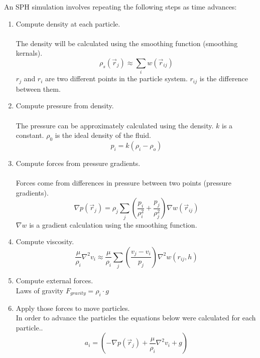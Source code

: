 \documentclass[a4paper,12pt,twoside,final]{report}
\begin{document}
\noindent An SPH simulation involves repeating the following steps as time advances:
\begin{enumerate}

\item Compute density at each particle. \\ \\
\noindent The density will be calculated using the smoothing function (smoothing kernals).
\begin{equation}
{\rho_s}{(\overrightarrow r_j)} {\approx} {\sum_i}{w(\overrightarrow r_{ij})}
\label{e3}
\end{equation}
\noindent $r_j$ and $r_i$ are two different points in the particle system. $r_{ij}$ is the difference between them. \\

\item Compute pressure from density. \\ \\
\noindent The pressure can be approximately calculated using the density. $k$ is a constant. $\rho_0$ is the ideal density of the fluid.
\begin{equation}
{p_i} = {k(\rho_i -\rho_o)}
\label{e4}
\end{equation}

\item Compute forces from pressure gradients. \\ \\
\noindent Forces come from differences in pressure between two points (pressure gradients).
\begin{equation}
{\nabla p(\overrightarrow r_j)} =  {\rho_j}{\sum_j}(\frac{p_i}{\rho_i^2}+\frac{p_j}{\rho_j^2}){\nabla w(\overrightarrow r_{ij})}
\label{e5}
\end{equation}
\noindent $\nabla w$ is a gradient calculation using the smoothing function. \\

\item Compute viscosity.
\begin{equation}
\frac{\mu}{\rho_i}{ \nabla^2 v_i} \approx \frac{\mu}{\rho_i}{\sum_j}(\frac{v_j - v_i}{p_j}){\nabla^2 w(r_{ij},h)}
\label{e6}
\end{equation}

\item Compute external forces. \\
\noindent Laws of gravity $F_{gravity}=\rho_i \cdot g$

\item Apply those forces to move particles. \\
\noindent In order to advance the particles the equations below were calculated for each particle..
\begin{equation}
{a_i} = {(-\nabla p(\overrightarrow r_j) + \frac{\mu}{\rho_i}{ \nabla^2 v_i} + g)}
\label{e7}
\end{equation}


\end{enumerate}
\end{document}
